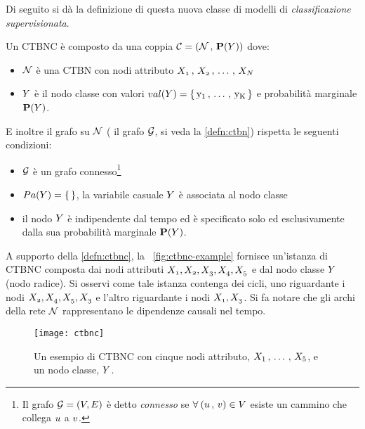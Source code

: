 Di seguito si dà la definizione di questa nuova classe di modelli di \emph{classificazione supervisionata}.
\begin{definizione}\label{defn:ctbnc}
Un \acf{CTBNC} è composto da una coppia $\mathcal{C}=(\mathcal{N}\,,\,\mathbf{P}(\mathnormal{Y}))$ dove:
\begin{itemize}
    \item $\mathcal{N}$ è una \acs{CTBN} con nodi attributo $\mathnormal{X_1}\,,\,\mathnormal{X_2}\,,\,\dotsc\,,\,\mathnormal{X_N}$
    \item $\mathnormal{Y}$ è il nodo classe con valori $val(\mathnormal{Y})=\{\,\mathrm{y_1}\,,\,\dotsc\,,\,\mathrm{y_K}\,\}$ e probabilità marginale $\mathbf{P}(\mathnormal{Y})$.
\end{itemize}
E inoltre il grafo su $\mathcal{N}$ (\ie{} il grafo $\mathcal{G}$, si veda la \autoref{defn:ctbn}) rispetta le seguenti condizioni:
\begin{itemize}
    \item $\mathcal{G}$ è un grafo connesso\footnote{Il grafo $\mathcal{G} = (\mathnormal{V}, \mathnormal{E})$ è detto \emph{connesso} se $\forall \: (\mathnormal{u}\,,\,\mathnormal{v}) \in \mathnormal{V}$ esiste un cammino che collega $\mathnormal{u}$ a $\mathnormal{v}$.}
    \item $Pa(\mathnormal{Y})=\{\,\}$, \ie{} la variabile casuale $\mathnormal{Y}$ è associata al nodo classe
    \item il nodo $\mathnormal{Y}$ è indipendente dal tempo ed è specificato solo ed esclusivamente dalla sua probabilità marginale $\mathbf{P}(\mathnormal{Y})$.
\end{itemize}
\end{definizione}
A supporto della \autoref{defn:ctbnc}, la ~\vref{fig:ctbnc-example} fornisce un'istanza di \acs{CTBNC} composta dai nodi attributi $\mathnormal{X_1},\mathnormal{X_2},\mathnormal{X_3},\mathnormal{X_4},\mathnormal{X_5}$ e dal nodo classe $\mathnormal{Y}$ (nodo radice). Si osservi come tale istanza contenga dei cicli, uno riguardante i nodi $\mathnormal{X_2},\mathnormal{X_4},\mathnormal{X_5},\mathnormal{X_3}$ e l'altro riguardante i nodi $\mathnormal{X_1},\mathnormal{X_3}$. Si fa notare che gli archi della rete $\mathcal{N}$ rappresentano le dipendenze causali nel tempo.


\begin{figure}
\centering
\texttt{[image: ctbnc]}
\caption[Un esempio di \acs{CTBNC}]{Un esempio di \acf{CTBNC} con cinque nodi attributo, $\mathnormal{X}_1\,,\,\dotsc\,,\,\mathnormal{X}_5$, e un nodo classe, $\mathnormal{Y}$.}
\label{fig:ctbnc-example}
\end{figure}


